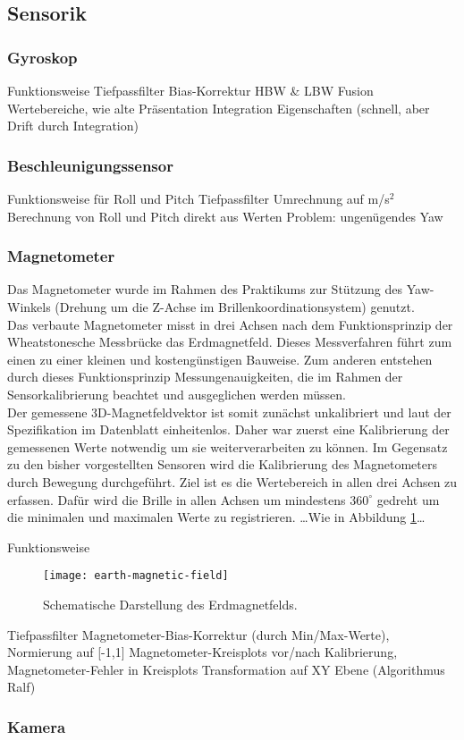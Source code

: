 
\subsection{Sensorik}


\subsubsection{Gyroskop}
Funktionsweise
Tiefpassfilter
Bias-Korrektur
HBW \& LBW Fusion
Wertebereiche, wie alte Präsentation
Integration
Eigenschaften (schnell, aber Drift durch Integration)


\subsubsection{Beschleunigungssensor}
Funktionsweise
für Roll und Pitch
Tiefpassfilter
Umrechnung auf m/s$^2$
Berechnung von Roll und Pitch direkt aus Werten
Problem: ungenügendes Yaw


\subsubsection{Magnetometer}
Das Magnetometer wurde im Rahmen des Praktikums zur Stützung des Yaw-Winkels (Drehung um die Z-Achse im Brillenkoordinationsystem) genutzt.\\
Das verbaute Magnetometer misst in drei Achsen nach dem Funktionsprinzip der Wheatstonesche Messbrücke \cite{renaudin2010complete} das Erdmagnetfeld. Dieses Messverfahren führt zum einen zu einer kleinen und kostengünstigen Bauweise. Zum anderen entstehen durch dieses Funktionsprinzip Messungenauigkeiten, die im Rahmen der Sensorkalibrierung beachtet und ausgeglichen werden müssen.\\
Der gemessene 3D-Magnetfeldvektor ist somit zunächst unkalibriert und laut der Spezifikation im Datenblatt  einheitenlos.
Daher war zuerst eine Kalibrierung der gemessenen Werte notwendig um sie weiterverarbeiten zu können. Im Gegensatz zu den bisher vorgestellten Sensoren wird die Kalibrierung des Magnetometers durch Bewegung durchgeführt. Ziel ist es die Wertebereich in allen drei Achsen zu erfassen. Dafür wird die Brille in allen Achsen um mindestens $360^\circ$ gedreht um die minimalen und maximalen Werte zu registrieren. \ldots Wie in Abbildung \ref{fig:mag_world}\ldots



Funktionsweise

\begin{figure}
   \centering
   \texttt{[image: earth-magnetic-field]}
   \caption[mag_world]{Schematische Darstellung des Erdmagnetfelds.}
   \label{fig:mag_world}
\end{figure}


Tiefpassfilter
Magnetometer-Bias-Korrektur (durch Min/Max-Werte), Normierung auf [-1,1]
Magnetometer-Kreisplots vor/nach Kalibrierung, Magnetometer-Fehler in Kreisplots
Transformation auf XY Ebene (Algorithmus Ralf)


\subsubsection{Kamera}

